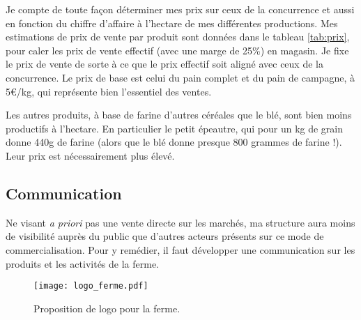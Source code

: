 \documentclass{book}
\begin{document}
Je compte de toute façon déterminer mes prix sur ceux de la concurrence et aussi en fonction du chiffre d’affaire à l’hectare de mes différentes productions. Mes estimations de prix de vente par produit sont données dans le tableau \ref{tab:prix}, pour caler les prix de vente effectif (avec une marge de 25\%) en magasin. Je fixe le prix de vente de sorte à ce que le prix effectif soit aligné avec ceux de la concurrence. Le prix de base est celui du pain complet et du pain de campagne, à 5\euro{}/kg, qui représente bien l’essentiel des ventes.

Les autres produits, à base de farine d’autres céréales que le blé, sont bien moins productifs à l’hectare. En particulier le petit épeautre, qui pour un kg de grain donne 440g de farine (alors que le blé donne presque 800 grammes de farine !). Leur prix est nécessairement plus élevé. 

\subsection{Communication}

Ne visant \textit{a priori} pas une vente directe sur les marchés, ma structure aura moins de visibilité auprès du public que d'autres acteurs présents sur ce mode de commercialisation. Pour y remédier, il faut développer une communication sur les produits et les activités de la ferme.

\begin{figure}[h!]
\begin{center}
	\texttt{[image: logo\_ferme.pdf]}
	\caption{Proposition de logo pour la ferme.}
	\label{fig:logo}
\end{center}
\end{figure}
\end{document}
